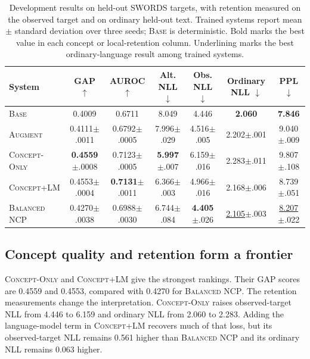 \documentclass[11pt]{article}
\newcommand{\base}{\textsc{Base}}
\newcommand{\aug}{\textsc{Augment}}
\newcommand{\peq}{\textsc{Concept-Only}}
\newcommand{\pcode}{\textsc{Concept+LM}}
\newcommand{\method}{\textsc{Balanced NCP}}
\begin{document}
\begin{table}[t]
\centering\scriptsize\setlength{\tabcolsep}{3.5pt}
\begin{tabular}{lcccccc}
\toprule
System & GAP $\uparrow$ & AUROC $\uparrow$ & Alt. NLL $\downarrow$ & Obs. NLL $\downarrow$ & Ordinary NLL $\downarrow$ & PPL $\downarrow$ \\
\midrule
\base{} & 0.4009 & 0.6711 & 8.049 & 4.446 & \textbf{2.060} & \textbf{7.846} \\
\aug{} & 0.4111{\scriptsize$\pm$.0011} & 0.6792{\scriptsize$\pm$.0005} & 7.996{\scriptsize$\pm$.029} & 4.516{\scriptsize$\pm$.005} & 2.202{\scriptsize$\pm$.001} & 9.040{\scriptsize$\pm$.009} \\
\peq{} & \textbf{0.4559}{\scriptsize$\pm$.0008} & 0.7123{\scriptsize$\pm$.0005} & \textbf{5.997}{\scriptsize$\pm$.007} & 6.159{\scriptsize$\pm$.016} & 2.283{\scriptsize$\pm$.011} & 9.807{\scriptsize$\pm$.108} \\
\pcode{} & 0.4553{\scriptsize$\pm$.0004} & \textbf{0.7131}{\scriptsize$\pm$.0011} & 6.366{\scriptsize$\pm$.003} & 4.966{\scriptsize$\pm$.016} & 2.168{\scriptsize$\pm$.006} & 8.739{\scriptsize$\pm$.051} \\
\method{} & 0.4270{\scriptsize$\pm$.0038} & 0.6988{\scriptsize$\pm$.0030} & 6.744{\scriptsize$\pm$.084} & \textbf{4.405}{\scriptsize$\pm$.026} & \underline{2.105}{\scriptsize$\pm$.003} & \underline{8.207}{\scriptsize$\pm$.022} \\
\bottomrule
\end{tabular}
\caption{Development results on held-out SWORDS targets, with retention measured
on the observed target and on ordinary held-out text. Trained systems report
mean $\pm$ standard deviation over three seeds; \base{} is deterministic. Bold
marks the best value in each concept or local-retention column. Underlining marks
the best ordinary-language result among trained systems.}
\label{tab:main}
\end{table}

\subsection{Concept quality and retention form a frontier}

\peq{} and \pcode{} give the strongest rankings. Their GAP scores are 0.4559 and
0.4553, compared with 0.4270 for \method{}. The retention measurements change the
interpretation. \peq{} raises observed-target NLL from 4.446 to 6.159 and ordinary
NLL from 2.060 to 2.283. Adding the language-model term in \pcode{} recovers much
of that loss, but its observed-target NLL remains 0.561 higher than \method{} and
its ordinary NLL remains 0.063 higher.
\end{document}
